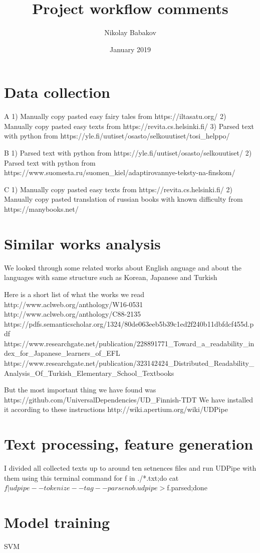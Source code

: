 \documentclass{article}
\title{Project workflow comments
}
\author{Nikolay Babakov
 }
\date{January 2019}
\begin{document}
\maketitle

\section{Data collection}
A
1) Manually copy pasted easy fairy tales from https://iltasatu.org/
2) Manually copy pasted easy texts from https://revita.cs.helsinki.fi/
3) Parsed text with python from https://yle.fi/uutiset/osasto/selkouutiset/tosi_helppo/

B
1) Parsed text with python from https://yle.fi/uutiset/osasto/selkouutiset/
2) Parsed text with python from https://www.suomesta.ru/suomen_kiel/adaptirovannye-teksty-na-finskom/

C
1) Manually copy pasted easy texts from https://revita.cs.helsinki.fi/
2) Manually copy pasted translation of russian books with known difficulty from https://manybooks.net/

\section{Similar works analysis}
We looked through some related works about English anguage and about the languages with same structure such as Korean, Japanese and Turkish

Here is a short list of what the works we read
http://www.aclweb.org/anthology/W16-0531
http://www.aclweb.org/anthology/C88-2135
https://pdfs.semanticscholar.org/1324/80de063eeb5b39c1ed2f240b11dbfdcf455d.pdf
https://www.researchgate.net/publication/228891771_Toward_a_readability_index_for_Japanese_learners_of_EFL
https://www.researchgate.net/publication/323142424_Distributed_Readability_Analysis_Of_Turkish_Elementary_School_Textbooks

But the most important thing we have found was https://github.com/UniversalDependencies/UD_Finnish-TDT
We have installed it according to these instructions http://wiki.apertium.org/wiki/UDPipe

\section{Text processing, feature generation}

I divided all collected texts up to around ten setnences files and run UDPipe with them using this terminal command
for f in ./*.txt;do cat $f | udpipe --tokenize --tag --parse nob.udpipe
 > $f.parsed;done
 
 
 
 \section{Model training}
SVM 
 
\end{document}
